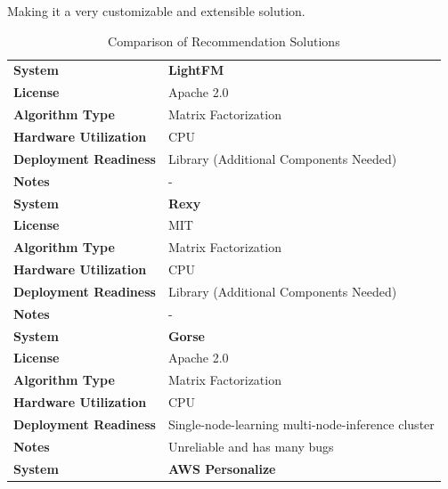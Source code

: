 Making it a very customizable and extensible solution.

\begin{table}[h]
    \centering
    \caption{Comparison of Recommendation Solutions}
    \footnotesize
    \setlength{\tabcolsep}{12pt} %
    \renewcommand{\arraystretch}{1.5} %
    \begin{tabular}{|l|l|}
        \hline
        \textbf{System} & \textbf{LightFM} \\
        \cline{2-2}
        \textbf{License} & Apache 2.0 \\
        \cline{2-2}
        \textbf{Algorithm Type} & Matrix Factorization \\
        \cline{2-2}
        \textbf{Hardware Utilization} & CPU \\
        \cline{2-2}
        \textbf{Deployment Readiness} & Library (Additional Components Needed) \\
        \cline{2-2}
        \textbf{Notes} & - \\
        \hline
        \hline
        \textbf{System} & \textbf{Rexy} \\
        \cline{2-2}
        \textbf{License} & MIT \\
        \cline{2-2}
        \textbf{Algorithm Type} & Matrix Factorization \\
        \cline{2-2}
        \textbf{Hardware Utilization} & CPU \\
        \cline{2-2}
        \textbf{Deployment Readiness} & Library (Additional Components Needed) \\
        \cline{2-2}
        \textbf{Notes} & - \\
        \hline
        \hline
        \textbf{System} & \textbf{Gorse} \\
        \cline{2-2}
        \textbf{License} & Apache 2.0 \\
        \cline{2-2}
        \textbf{Algorithm Type} & Matrix Factorization \\
        \cline{2-2}
        \textbf{Hardware Utilization} & CPU \\
        \cline{2-2}
        \textbf{Deployment Readiness} & Single-node-learning multi-node-inference cluster \\
        \cline{2-2}
        \textbf{Notes} & Unreliable and has many bugs \\
        \hline
        \hline
        \textbf{System} &\textbf{AWS Personalize} \\

\end{tabular}
\end{table}
